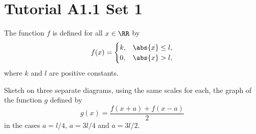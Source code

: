 \section{Tutorial A1.1 Set 1}

\begin{problem}
    The function $f$ is defined for all $x \in \RR$ by \[f(x) = \begin{cases}
        k, & \abs{x} \leq l,\\
        0, & \abs{x} > l,
    \end{cases}\] where $k$ and $l$ are positive constants.

    Sketch on three separate diagrams, using the same scales for each, the graph of the function $g$ defined by \[g(x) = \frac{f(x+a) + f(x-a)}2\] in the cases $a = l/4$, $a = 3l/4$ and $a = 3l/2$.
\end{problem}
